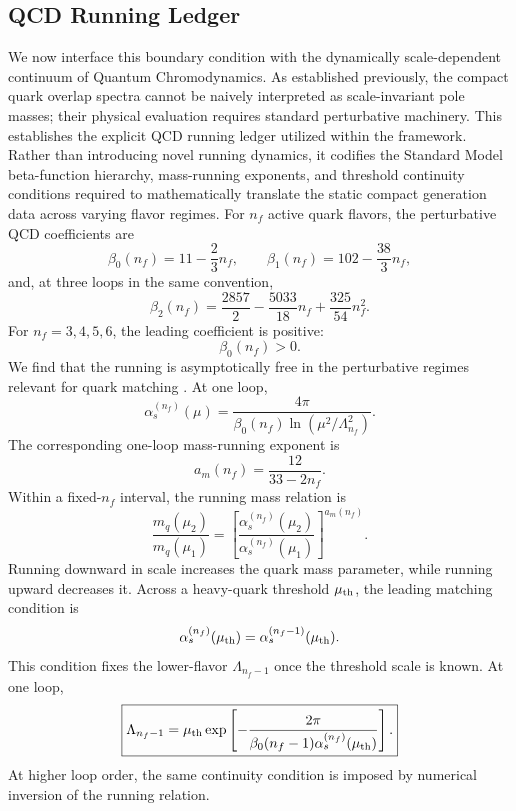 \documentclass[11pt]{article}
\begin{document}
\subsection{QCD Running Ledger}
\label{sec:pr2_qcd_running_ledger_main}
We now interface this boundary condition with the dynamically scale-dependent continuum of Quantum Chromodynamics. As established previously, the compact quark overlap spectra cannot be naively interpreted as scale-invariant pole masses; their physical evaluation requires standard perturbative machinery. This establishes the explicit QCD running ledger utilized within the framework. Rather than introducing novel running dynamics, it codifies the Standard Model beta-function hierarchy, mass-running exponents, and threshold continuity conditions required to mathematically translate the static compact generation data across varying flavor regimes. For \(n_f\) active quark flavors, the perturbative QCD coefficients \cite{Tarasov1980} are
\begin{equation}
\boxed{
\beta_0(n_f)
=
11-\frac{2}{3}n_f,
}
\qquad
\boxed{
\beta_1(n_f)
=
102-\frac{38}{3}n_f,
}
\end{equation}
and, at three loops in the same convention,
\begin{equation}
\boxed{
\beta_2(n_f)
=
\frac{2857}{2}
-
\frac{5033}{18}n_f
+
\frac{325}{54}n_f^2.
}
\end{equation}
For \(n_f=3,4,5,6\), the leading coefficient is positive:
\begin{equation}
\beta_0(n_f)>0.
\end{equation}
We find that the running is asymptotically free in the perturbative regimes relevant for quark matching \cite{GrossWilczek1973}. At one loop,
\begin{equation}
\alpha_s^{(n_f)}(\mu)
=
\frac{4\pi}
{\beta_0(n_f)
\ln
\left(
\mu^2/\Lambda_{n_f}^2
\right)
}.
\end{equation}
The corresponding one-loop mass-running exponent is
\begin{equation}
\boxed{
a_m(n_f)
=
\frac{12}{33-2n_f}.
}
\end{equation}
Within a fixed-\(n_f\) interval, the running mass relation is
\begin{equation}
\boxed{
\frac{m_q(\mu_2)}{m_q(\mu_1)}
=
\left[
\frac{
\alpha_s^{(n_f)}(\mu_2)
}{
\alpha_s^{(n_f)}(\mu_1)
}
\right]^{a_m(n_f)}.
}
\end{equation}
Running downward in scale increases the quark mass parameter, while running upward decreases it. Across a heavy-quark threshold \(\mu_{\rm th}\), the leading matching condition is
\begin{equation}
\alpha_s^{(n_f)}(\mu_{\rm th})
=
\alpha_s^{(n_f-1)}(\mu_{\rm th}).
\end{equation}
This condition fixes the lower-flavor \(\Lambda_{n_f-1}\) once the threshold scale is known. At one loop,
\begin{equation}
\boxed{
\Lambda_{n_f-1}
=
\mu_{\rm th}
\exp
\left[
-\frac{2\pi}
{\beta_0(n_f-1)\alpha_s^{(n_f)}(\mu_{\rm th})}
\right].
}
\end{equation}
At higher loop order, the same continuity condition is imposed by numerical inversion of the running relation.
\end{document}
